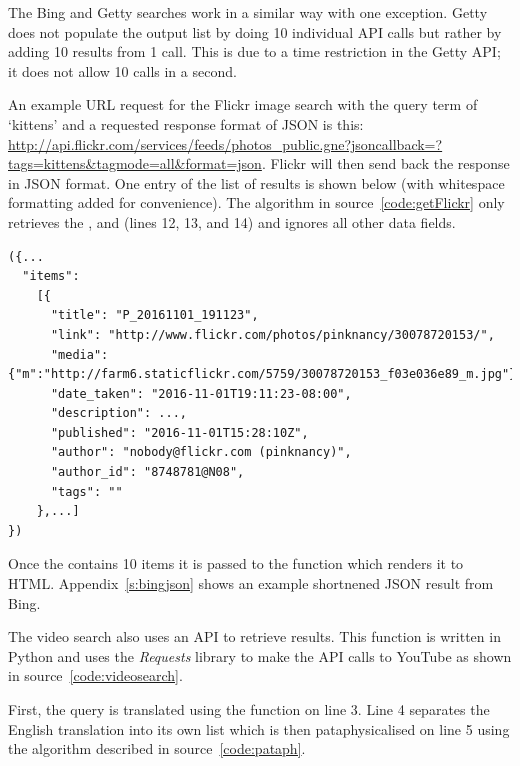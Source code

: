 The Bing and Getty searches work in a similar way with one exception. Getty does not populate the output list by doing 10 individual \ac{API} calls but rather by adding 10 results from 1 call. This is due to a time restriction in the Getty \ac{API}; it does not allow 10 calls in a second.

\spirals

An example \ac{URL} request for the Flickr image search with the query term of `kittens' and a requested response format of \ac{JSON} is this:
\url{http://api.flickr.com/services/feeds/photos_public.gne?jsoncallback=?tags=kittens&tagmode=all&format=json}. Flickr will then send back the response in \ac{JSON} format. One entry of the list of results is shown below (with whitespace formatting added for convenience). The algorithm in source~\ref{code:getFlickr} only retrieves the ,  and  (lines 12, 13, and 14) and ignores all other data fields.

\begin{verbatim}
({...
  "items": 
    [{
      "title": "P_20161101_191123",
      "link": "http://www.flickr.com/photos/pinknancy/30078720153/",
      "media": {"m":"http://farm6.staticflickr.com/5759/30078720153_f03e036e89_m.jpg"},
      "date_taken": "2016-11-01T19:11:23-08:00",
      "description": ...,
      "published": "2016-11-01T15:28:10Z",
      "author": "nobody@flickr.com (pinknancy)",
      "author_id": "8748781@N08",
      "tags": ""
    },...]
})
\end{verbatim}

Once the  contains 10 items it is passed to the  function which renders it to \ac{HTML}. Appendix~\ref{s:bingjson} shows an example shortnened \ac{JSON} result from Bing.

\spirals

The video search also uses an \ac{API} to retrieve results. This function is written in Python and uses the \textit{Requests} library \autocite{Reitznd} to make the \ac{API} calls to YouTube \autocite{YouTubeAPI} as shown in source~\ref{code:videosearch}.

First, the query is translated using the  function on line 3. Line 4 separates the English translation into its own list  which is then pataphysicalised on line 5 using the algorithm described in source~\ref{code:pataph}.

